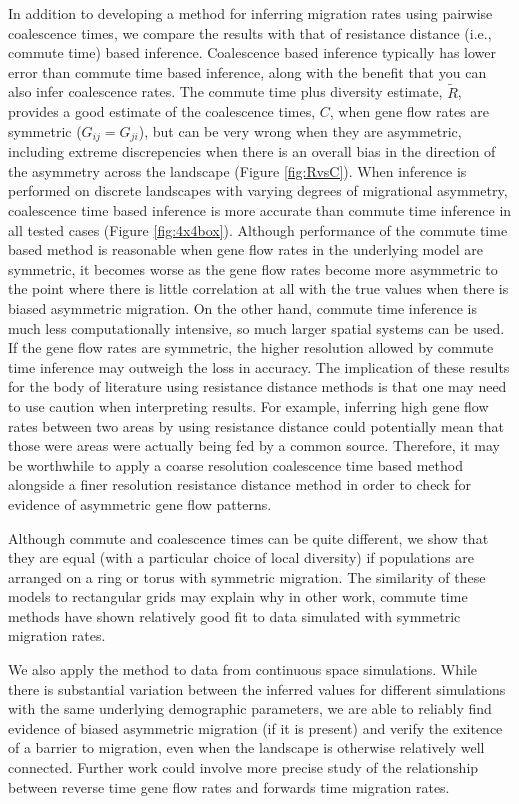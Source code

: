 \documentclass{article}
\newcommand{\comdist}{\widetilde{R}}
\begin{document}
In addition to developing a method for inferring migration rates using pairwise coalescence times,
we compare the results with that of resistance distance (i.e., commute time) based inference.
Coalescence based inference typically has lower error than commute time based inference,
along with the benefit that you can also infer coalescence rates. 
The commute time plus diversity estimate, $\comdist$, 
provides a good estimate of the coalescence times, $C$,
when gene flow rates are symmetric ($G_{ij} = G_{ji}$), 
but can be very wrong when they are asymmetric, 
including extreme discrepencies 
when there is an overall bias in the direction of the asymmetry across the landscape 
(Figure \ref{fig:RvsC}).
When inference is performed on discrete landscapes 
with varying degrees of migrational asymmetry, 
coalescence time based inference is more accurate than commute time inference in all tested cases
(Figure \ref{fig:4x4box}).
Although performance of the commute time based method is reasonable 
when gene flow rates in the underlying model are symmetric, 
it becomes worse as the gene flow rates become more asymmetric 
to the point where there is little correlation at all with the true values 
when there is biased asymmetric migration.
On the other hand, commute time inference is much less computationally intensive, 
so much larger spatial systems can be used.
If the gene flow rates are symmetric, the higher resolution allowed by commute time inference
may outweigh the loss in accuracy.
The implication of these results for the body of literature using resistance distance methods
is that one may need to use caution when interpreting results.
For example, inferring high gene flow rates between two areas by using resistance distance
could potentially mean that those were areas were actually being fed by a common source.
Therefore, it may be worthwhile to apply a coarse resolution coalescence time based method 
alongside a finer resolution resistance distance method 
in order to check for evidence of asymmetric gene flow patterns.

Although commute and coalescence times can be quite different,
we show that they are equal (with a particular choice of local diversity)
if populations are arranged on a ring or torus
with symmetric migration.
The similarity of these models to rectangular grids
may explain why in other work, commute time methods have shown relatively good fit to data
simulated with symmetric migration rates.

We also apply the method to data from continuous space simulations. 
While there is substantial variation between the inferred values 
for different simulations with the same underlying demographic parameters, 
we are able to reliably find evidence of biased asymmetric migration (if it is present)
and verify the exitence of a barrier to migration, 
even when the landscape is otherwise relatively well connected.
Further work could involve more precise study of the relationship
between reverse time gene flow rates and forwards time migration rates.
\end{document}
